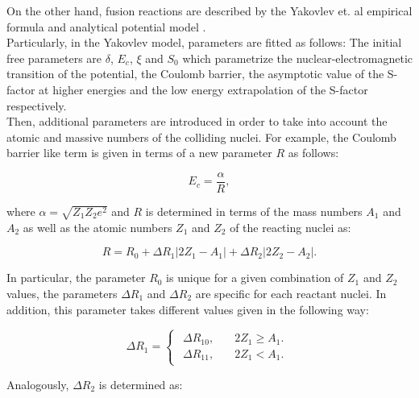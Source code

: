 \documentclass[openany]{book}
\begin{document}
On the other hand, fusion reactions are described by the Yakovlev et. al empirical formula \cite{beard_afanasjev_chamon_gasques_wiescher_yakovlev_2010} and analytical potential model  \cite{yakovlev_beard_gasques_wiescher_2010}.  \\

Particularly, in the Yakovlev model, parameters are fitted as follows: The initial free parameters are $\delta$, $E_c$,  $\xi$ and $S_0$ which parametrize the nuclear-electromagnetic transition of the potential, the Coulomb barrier, the asymptotic value of the S-factor at higher energies and the low energy extrapolation of the S-factor respectively.  \\

Then, additional parameters are introduced in order to take into account the atomic and massive numbers of the colliding nuclei. For example, the Coulomb barrier like term is given in terms of a new parameter $R$ as follows:

\begin{equation} \label{eq:potential_Yakovlev_Ec}
	E_c = \frac{\alpha}{R},
\end{equation}

where $\alpha = \sqrt{Z_1Z_2e^2}$ and $R$ is determined in terms of the mass numbers $A_1$ and $A_2$ as well as the atomic numbers $Z_1$ and $Z_2$ of the reacting nuclei as:

\begin{equation} \label{eq:potential_Yakovlev_R}
	R = R_0 + \Delta R_{1} |2Z_1 - A_1| + \Delta R_{2}|2Z_2 - A_2|.
\end{equation}

In particular, the parameter $R_0$ is unique for a given combination of $Z_1$ and $Z_2$ values,  the parameters $\Delta R_{1}$ and $\Delta R_{2}$ are specific for each reactant nuclei. In addition, this parameter takes different values given in the following way: 

\begin{equation} \label{eq:potential_Yakovlev_R1}
	\Delta R_1= 	\left\{\begin{array}{l}
		\begin{split}
			\Delta R_{10}, \quad & 2Z_1 \ge A_1.\\ 
			\Delta R_{11}, \quad & 2Z_1 < A_1.
		\end{split}
	\end{array}\right.
\end{equation}

Analogously, $\Delta R_2$ is determined as: 
\end{document}
